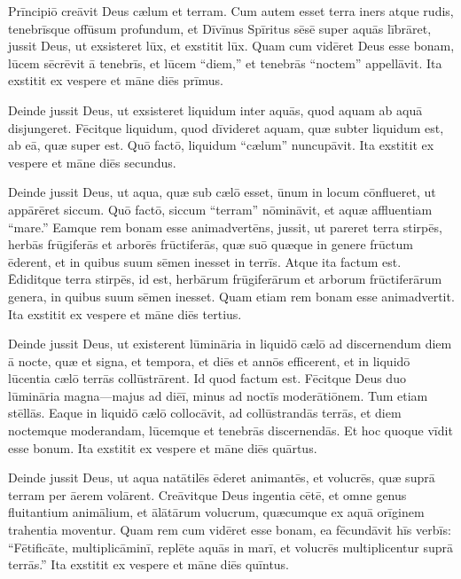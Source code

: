 

\Caput
\Versus Prīncipiō creāvit Deus cælum et terram.
\Versus Cum autem esset terra iners atque rudis, tenebrīsque offūsum profundum, et Dīvīnus Spīritus sēsē super aquās lībrāret,
\Versus jussit Deus, ut exsisteret lūx, et exstitit lūx.
\Versus Quam cum vidēret Deus esse bonam, lūcem sēcrēvit ā tenebrīs,
\Versus et lūcem ``diem,'' et tenebrās ``noctem'' appellāvit. Ita exstitit ex vespere et māne diēs prīmus.%

\Versus Deinde jussit Deus, ut exsisteret liquidum inter aquās, quod aquam ab aquā disjungeret.
\Versus Fēcitque liquidum, quod dīvideret aquam, quæ subter liquidum est, ab eā, quæ super est.
\Versus Quō factō, liquidum ``cælum'' nuncupāvit. Ita exstitit ex vespere et māne diēs secundus.

\Versus Deinde jussit Deus, ut aqua, quæ sub cælō esset, ūnum in locum cōnflueret, ut appārēret siccum.
\Versus Quō factō, siccum ``terram'' nōmināvit, et aquæ affluentiam ``mare.'' Eamque rem bonam esse animadvertēns, 
\Versus jussit, ut pareret terra stirpēs, herbās frūgiferās et arborēs frūctiferās, quæ suō quæque in genere frūctum ēderent, et in quibus suum sēmen inesset in terrīs. Atque ita factum est.
\Versus Ēdiditque terra stirpēs, id est, herbārum frūgiferārum et arborum frūctiferārum genera, in quibus suum sēmen inesset. Quam etiam rem bonam esse animadvertit.
\Versus Ita exstitit ex vespere et māne diēs tertius.

\Versus Deinde jussit Deus, ut existerent lūmināria in liquidō cælō ad discernendum diem ā nocte, quæ et signa, et tempora, et diēs et annōs efficerent,
\Versus et in liquidō lūcentia cælō terrās collūstrārent. Id quod factum est.
\Versus Fēcitque Deus duo lūmināria magna—majus ad diēī, minus ad noctīs moderātiōnem. Tum etiam stēllās.
\Versus Eaque in liquidō cælō collocāvit, ad collūstrandās terrās,
\Versus et diem noctemque moderandam, lūcemque et tenebrās discernendās. Et hoc quoque vīdit esse bonum.
\Versus Ita exstitit ex vespere et māne diēs quārtus.

\Versus Deinde jussit Deus, ut aqua natātilēs ēderet animantēs, et volucrēs, quæ suprā terram per āerem volārent.
\Versus Creāvitque Deus ingentia cētē, et omne genus fluitantium animālium, et ālātārum volucrum, quæcumque ex aquā orīginem trahentia moventur. Quam rem cum vidēret esse bonam,
\Versus ea fēcundāvit hīs verbīs: ``Fētificāte, multiplicāminī, replēte aquās in marī, et volucrēs multiplicentur suprā terrās.''
\Versus Ita exstitit ex vespere et māne diēs quīntus.

